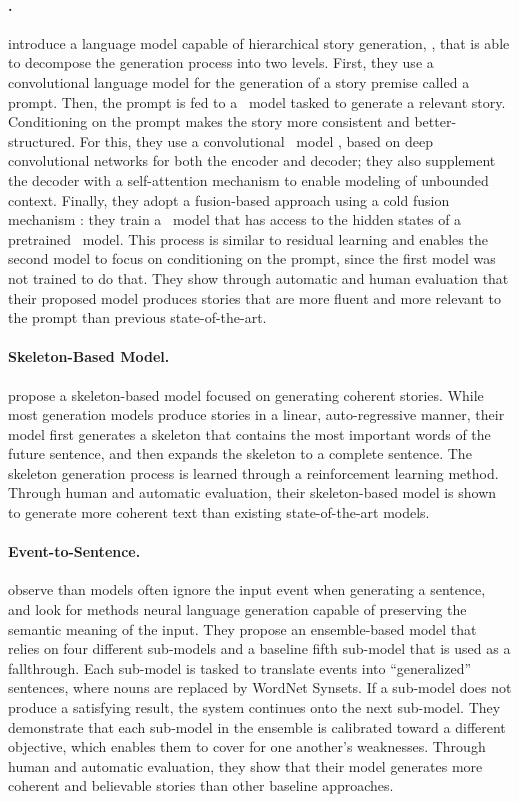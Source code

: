 \paragraph{\fusion.}
\citet{fan2018hierarchical} introduce a language model capable of hierarchical story generation, \ie, that is able to decompose the generation process into two levels. First, they use a convolutional language model \citep{dauphin2017language} for the generation of a story premise called a prompt. Then, the prompt is fed to a \seqseq\ model tasked to generate a relevant story. Conditioning on the prompt makes the story more consistent and better-structured. For this, they use a convolutional \seqseq\ model \citep{gehring2017convolutional}, based on deep convolutional networks for both the encoder and decoder; they also supplement the decoder with a self-attention mechanism to enable modeling of unbounded context. Finally, they adopt a fusion-based approach using a cold fusion mechanism \citep{sriram2017cold}: they train a \seqseq\ model that has access to the hidden states of a pretrained \seqseq\ model. This process is similar to residual learning and enables the second model to focus on conditioning on the prompt, since the first model was not trained to do that. They show through automatic and human evaluation that their proposed model produces stories that are more fluent and more relevant to the prompt than previous state-of-the-art.

\paragraph{Skeleton-Based Model.}
\citet{xu-etal-2018-skeleton} propose a skeleton-based model focused on generating coherent stories. While most generation models produce stories in a linear, auto-regressive manner, their model first generates a skeleton that contains the most important words of the future sentence, and then expands the skeleton to a complete sentence. The skeleton generation process is learned through a reinforcement learning method. Through human and automatic evaluation, their skeleton-based model is shown to generate more coherent text than existing state-of-the-art models.

\paragraph{Event-to-Sentence.}
\citet{ammanabrolu2020story} observe than {\seqseq} models often ignore the input event when generating a sentence, and look for methods neural language generation capable of preserving the semantic meaning of the input. They propose an ensemble-based model that relies on four different sub-models and a baseline fifth sub-model that is used as a fallthrough. Each sub-model is tasked to translate events into ``generalized'' sentences, where nouns are replaced by WordNet Synsets. If a sub-model does not produce a satisfying result, the system continues onto the next sub-model. They demonstrate that each sub-model in the ensemble is calibrated toward a different objective, which enables them to cover for one another's weaknesses. Through human and automatic evaluation, they show that their model generates more coherent and believable stories than other baseline approaches.


